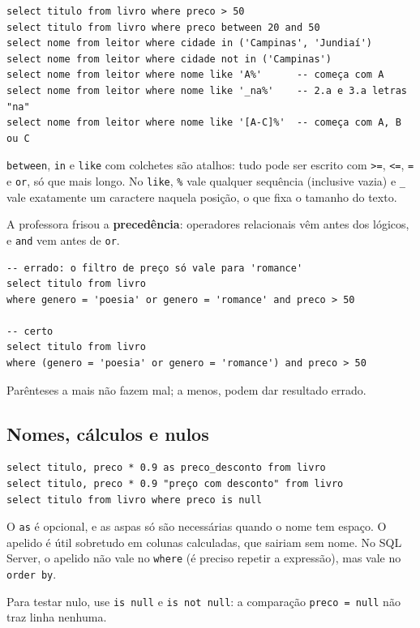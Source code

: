 \begin{lstlisting}
select titulo from livro where preco > 50
select titulo from livro where preco between 20 and 50
select nome from leitor where cidade in ('Campinas', 'Jundiaí')
select nome from leitor where cidade not in ('Campinas')
select nome from leitor where nome like 'A%'      -- começa com A
select nome from leitor where nome like '_na%'    -- 2.a e 3.a letras "na"
select nome from leitor where nome like '[A-C]%'  -- começa com A, B ou C
\end{lstlisting}

\texttt{between}, \texttt{in} e \texttt{like} com colchetes são
atalhos: tudo pode ser escrito com \texttt{>=}, \texttt{<=}, \texttt{=}
e \texttt{or}, só que mais longo. No \texttt{like}, \texttt{\%} vale
qualquer sequência (inclusive vazia) e \texttt{\_} vale exatamente um
caractere naquela posição, o que fixa o tamanho do texto.

A professora frisou a \textbf{precedência}: operadores relacionais vêm
antes dos lógicos, e \texttt{and} vem antes de \texttt{or}.

\begin{lstlisting}
-- errado: o filtro de preço só vale para 'romance'
select titulo from livro
where genero = 'poesia' or genero = 'romance' and preco > 50

-- certo
select titulo from livro
where (genero = 'poesia' or genero = 'romance') and preco > 50
\end{lstlisting}

Parênteses a mais não fazem mal; a menos, podem dar resultado errado.

\subsection{Nomes, cálculos e nulos}

\begin{lstlisting}
select titulo, preco * 0.9 as preco_desconto from livro
select titulo, preco * 0.9 "preço com desconto" from livro
select titulo from livro where preco is null
\end{lstlisting}

O \texttt{as} é opcional, e as aspas só são necessárias quando o nome tem
espaço. O apelido é útil sobretudo em colunas calculadas, que sairiam sem
nome. No SQL Server, o apelido não vale no \texttt{where} (é preciso
repetir a expressão), mas vale no \texttt{order by}.

Para testar nulo, use \texttt{is null} e \texttt{is not null}: a
comparação \texttt{preco = null} não traz linha nenhuma.

